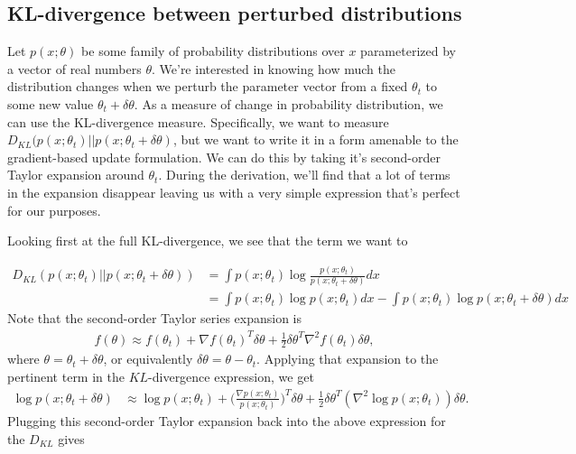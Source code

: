\subsection{KL-divergence between perturbed distributions}
Let $p(x; \theta)$ be some family of probability distributions over $x$ parameterized by a vector of real numbers $\theta$. We're interested in knowing how much the distribution changes when we perturb the parameter vector from a fixed $\theta_t$ to some new value $\theta_t+\delta \theta$. As a measure of change in probability distribution, we can use the KL-divergence measure. Specifically, we want to measure $D_{KL}(p(x;\theta_t)|| p(x;\theta_t+\delta \theta)$, but we want to write it in a form amenable to the gradient-based update formulation. We can do this by taking it's second-order Taylor expansion around $\theta_t$. During the derivation, we'll find that a lot of terms in the expansion disappear leaving us with a very simple expression that's perfect for our purposes. 

Looking first at the full KL-divergence, we see that the term we want to 

\begin{align*}
	D_{KL}(p(x;\theta_t)||p(x;\theta_t+\delta \theta)) &= \int p(x;\theta_t)\log \frac{p(x;\theta_t)}{p(x;\theta_t+\delta \theta)} dx\\
	&= \int p(x;\theta_t)\log p(x;\theta_t) dx - \int p(x;\theta_t)\log p(x;\theta_t+\delta \theta) dx
\end{align*}
Note that the second-order Taylor series expansion is
\begin{align*}
	f(\theta) \approx f(\theta_t) + \nabla f(\theta_t)^T\delta\theta + \frac{1}{2} \delta\theta^T\nabla^2f(\theta_t)\delta\theta,
\end{align*}
where $\theta=\theta_t+\delta\theta$, or equivalently $\delta\theta = \theta-\theta_t$. Applying that expansion to the pertinent term in the $KL$-divergence expression, we get
\begin{align*}
	\log p(x;\theta_t+\delta \theta) &\approx \log p(x;\theta_t) + \Bigg(\frac{\nabla p(x;\theta_t)}{p(x;\theta_t)}\Bigg)^T \delta \theta + \frac{1}{2}\delta\theta^T (\nabla^2 \log p(x;\theta_t))\delta\theta.
\end{align*}
Plugging this second-order Taylor expansion back into the above expression for the $D_{KL}$ gives

